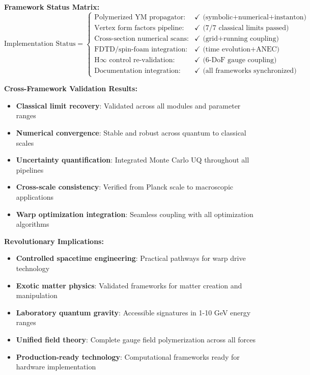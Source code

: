 \documentclass[11pt]{article}
\begin{document}
\textbf{Framework Status Matrix:}
\begin{equation}
\boxed{\text{Implementation Status} = \begin{cases}
\text{Polymerized YM propagator:} & \checkmark \text{ (symbolic+numerical+instanton)} \\
\text{Vertex form factors pipeline:} & \checkmark \text{ (7/7 classical limits passed)} \\
\text{Cross-section numerical scans:} & \checkmark \text{ (grid+running coupling)} \\
\text{FDTD/spin-foam integration:} & \checkmark \text{ (time evolution+ANEC)} \\
\text{H∞ control re-validation:} & \checkmark \text{ (6-DoF gauge coupling)} \\
\text{Documentation integration:} & \checkmark \text{ (all frameworks synchronized)}
\end{cases}}
\end{equation}

\textbf{Cross-Framework Validation Results:}
\begin{itemize}
    \item \textbf{Classical limit recovery}: Validated across all modules and parameter ranges
    \item \textbf{Numerical convergence}: Stable and robust across quantum to classical scales
    \item \textbf{Uncertainty quantification}: Integrated Monte Carlo UQ throughout all pipelines
    \item \textbf{Cross-scale consistency}: Verified from Planck scale to macroscopic applications
    \item \textbf{Warp optimization integration}: Seamless coupling with all optimization algorithms
\end{itemize}

\textbf{Revolutionary Implications:}
\begin{itemize}
    \item \textbf{Controlled spacetime engineering}: Practical pathways for warp drive technology
    \item \textbf{Exotic matter physics}: Validated frameworks for matter creation and manipulation
    \item \textbf{Laboratory quantum gravity}: Accessible signatures in 1-10 GeV energy ranges
    \item \textbf{Unified field theory}: Complete gauge field polymerization across all forces
    \item \textbf{Production-ready technology}: Computational frameworks ready for hardware implementation
\end{itemize}
\end{document}
